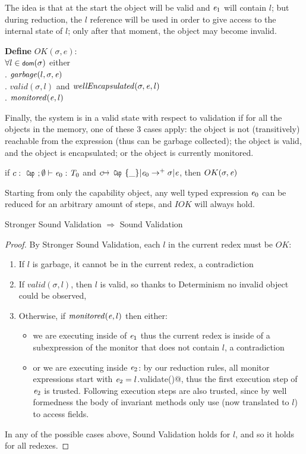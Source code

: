 The idea is that at the start the object will be valid and ${\mathit{e}}_1$ will contain $l$;
but during reduction, the $l$ reference will be used in order to
give access to the internal state of $l$; only after that moment, the object may become invalid.


\noindent\textbf{Define} $OK(\sigma,e)$:\\
\indent $\forall l\in\dom(\sigma)$
  either\\
\indent{}. $\mathit{garbage}(l,\sigma,\e)$\\
\indent{}. $\mathit{valid}(\sigma,l)$ and $\mathit{wellEncapsulated}(\sigma,\e,l)$\\
\indent{}. $\mathit{monitored}({\mathit{e}},l)$

Finally, the system is in a valid state with respect to validation
if for all the objects in the memory, one of these 3 cases apply:
the object is not (transitively) reachable from the expression (thus can be garbage collected);
the object is valid, and the object is encapsulated;
or the object is currently monitored.

\begin{theorem}
if $c:\Kw{Cap};\emptyset\vdash \e_0: \T_0$ and
$c\mapsto\Kw{Cap}\{\_\}|\e_0\rightarrow^+ \sigma|\e$, then
$OK(\sigma,\e)$
\end{theorem}
\noindent Starting from only the capability object,
any well typed expression ${\mathit{e}}_0$ can be reduced for an arbitrary amount of steps,
and $IOK$ will always hold.
\\
\begin{theorem} Stronger Sound Validation $\Rightarrow$ Sound Validation
\end{theorem}
\begin{proof}
\noindent By Stronger Sound Validation, each $l$ in the current redex must be $OK$:
\begin{enumerate}
	\item If $l$ is garbage, it cannot be in the current redex, a contradiction
	\item If $\mathit{valid}(\sigma,l)$, then $l$ is valid, so thanks to Determinism
	no invalid object could be observed,
	\item Otherwise, if $\mathit{monitored}({\mathit{e}},l)$ then either:
	\begin{itemize}
	 \item we are executing inside of ${\mathit{e}}_1$ thus the current redex is inside of a subexpression of the monitor that does not contain $l$, a contradiction
	 \item or we are executing inside ${\mathit{e}}_2$:
	 by our reduction rules, all monitor expressions start with 
	 ${\mathit{e}}_2=l$\Q@.validate()@, thus the first execution step
	 of ${\mathit{e}}_2$ is trusted. Following execution steps are also trusted, since by well formedness the body of invariant methods only use \Q@this@ (now translated to $l$) to access fields.
	\end{itemize}
\end{enumerate}
In any of the possible cases above, Sound Validation holds for $l$, and so it holds for all redexes.
\end{proof}


